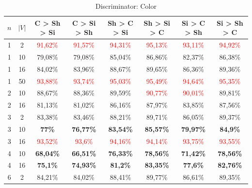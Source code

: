 \begin{table}[ht]
    \centering
    \begin{tabular}{cc|c|c|c|c|c|c}
        \toprule
        $n$ & $|V|$ & \textbf{C > Sh > Si}     & \textbf{C > Si > Sh}     & \textbf{Sh > C > Si}     & \textbf{Sh > Si > C}     & \textbf{Si > C > Sh}     & \textbf{Si > Sh > C}     \\\midrule
        {1} & {2}   & \textcolor{red}{91,62\%} & \textcolor{red}{91,57\%} & \textcolor{red}{94,31\%} & \textcolor{red}{95,13\%} & \textcolor{red}{93,11\%} & \textcolor{red}{94,92\%} \\
        {1} & {10}  & {79,08\%}                & {79,08\%}                & {85,04\%}                & {86,86\%}                & {82,37\%}                & {86,38\%}                \\
        {1} & {16}  & {84,02\%}                & {83,96\%}                & {88,67\%}                & {89,65\%}                & {86,36\%}                & {89,36\%}                \\
        {1} & {50}  & \textcolor{red}{93,88\%} & \textcolor{red}{93,74\%} & \textcolor{red}{95,03\%} & \textcolor{red}{95,49\%} & \textcolor{red}{94,64\%} & \textcolor{red}{95,35\%} \\
        {2} & {10}  & {88,67\%}                & {88,36\%}                & {89,59\%}                & \textcolor{red}{90,77\%} & \textcolor{red}{90,01\%} & {89,81\%}                \\
        {2} & {16}  & {81,13\%}                & {81,02\%}                & {86,16\%}                & {87,97\%}                & {83,85\%}                & {87,56\%}                \\
        {3} & {2}   & {83,38\%}                & {83,46\%}                & {88,21\%}                & {89,71\%}                & {86,05\%}                & {89,37\%}                \\
        {3} & {10}  & \textbf{77\%}            & \textbf{76,77\%}         & \textbf{83,54\%}         & \textbf{85,57\%}         & \textbf{79,97\%}         & \textbf{84,9\%}          \\
        {3} & {16}  & \textcolor{red}{93,52\%} & \textcolor{red}{93,6\%}  & \textcolor{red}{94,16\%} & \textcolor{red}{94,14\%} & \textcolor{red}{93,75\%} & \textcolor{red}{93,55\%} \\
        {4} & {10}  & \textbf{68,04\%}         & \textbf{66,51\%}         & \textbf{76,33\%}         & \textbf{78,56\%}         & \textbf{71,42\%}         & \textbf{78,56\%}         \\
        {4} & {16}  & \textbf{75,1\%}          & \textbf{74,93\%}         & \textbf{81,2\%}          & \textbf{83,35\%}         & \textbf{77,6\%}          & \textbf{82,76\%}         \\
        {6} & {2}   & {84,21\%}                & {84,02\%}                & {88,41\%}                & {89,77\%}                & {86,61\%}                & {89,35\%}                \\
        \bottomrule
    \end{tabular}
    \caption{Discriminator: Color}
    \label{tab:probing:discriminator:colour}
\end{table}

